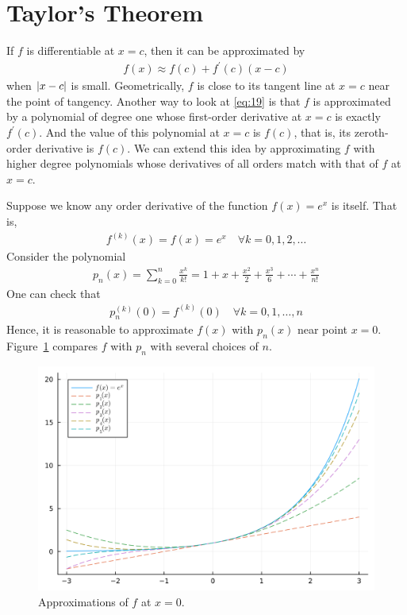 \documentclass[thmcnt=section, 12pt]{my-elegantbook}
\begin{document}

\section{Taylor's Theorem}

\par If $f$ is differentiable at $x = c$, then it can be approximated by
\begin{align}
    f(x) \approx f(c) + f^\prime(c)(x-c)
    \label{eq:19}
\end{align}
when $\left\lvert x-c \right\rvert$ is small. Geometrically, $f$ is close to its tangent line at $x=c$ near the point of tangency. Another way to look at \eqref{eq:19} is that $f$ is approximated by a polynomial of degree one whose first-order derivative at $x=c$ is exactly $f^\prime(c)$. And the value of this polynomial at $x=c$ is $f(c)$, that is, its zeroth-order derivative is $f(c)$. We can extend this idea by approximating $f$ with higher degree polynomials whose derivatives of all orders match with that of $f$ at $x = c$.

\begin{example}
    Suppose we know any order derivative of the function $f(x) = e^x$ is itself. That is,
    \begin{align*}
        f^{(k)}(x) = f(x) = e^x \quad \forall k = 0, 1, 2, \ldots
    \end{align*}
    Consider the polynomial
    \begin{align*}
        p_n(x)
        = \sum_{k=0}^n \frac{x^k}{k!}
        = 1 + x + \frac{x^2}{2} + \frac{x^3}{6} + \cdots + \frac{x^n}{n!}
    \end{align*}
    One can check that
    \begin{align*}
        p^{(k)}_n(0) = f^{(k)}(0)
        \quad \forall k = 0, 1, \ldots, n
    \end{align*}
    Hence, it is reasonable to approximate $f(x)$ with $p_n(x)$ near point $x = 0$. Figure~\ref{fig:7} compares $f$ with $p_n$ with several choices of $n$.

    \begin{figure}[ht]
        \centering
        \includegraphics[scale=0.2]{figures/graph-008.png}
        \caption{Approximations of $f$ at $x=0$.}
        \label{fig:7}
    \end{figure}
\end{example}
\end{document}
